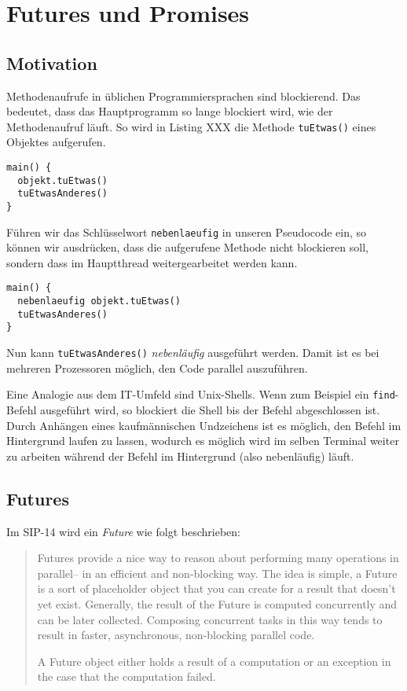 \section{Futures und Promises}

\subsection{Motivation}

Methodenaufrufe in üblichen Programmiersprachen sind blockierend. Das bedeutet,
dass das Hauptprogramm so lange blockiert wird, wie der Methodenaufruf läuft.
So wird in Listing XXX die Methode \texttt{tuEtwas()} eines Objektes aufgerufen.

\begin{lstlisting}
main() {
  objekt.tuEtwas()
  tuEtwasAnderes()
}
\end{lstlisting}

Führen wir das Schlüsselwort \texttt{nebenlaeufig} in unseren Pseudocode ein,
so können wir ausdrücken, dass die aufgerufene Methode nicht blockieren soll,
sondern dass im Hauptthread weitergearbeitet werden kann.

\begin{lstlisting}
main() {
  nebenlaeufig objekt.tuEtwas()
  tuEtwasAnderes()
}
\end{lstlisting}

Nun kann \texttt{tuEtwasAnderes()} \emph{nebenläufig} ausgeführt werden. Damit
ist es bei mehreren Prozessoren möglich, den Code parallel auszuführen.

Eine Analogie aus dem IT-Umfeld sind Unix-Shells. Wenn zum Beispiel ein
\texttt{find}-Befehl ausgeführt wird, so blockiert die Shell bis der Befehl
abgeschlossen ist. Durch Anhängen eines kaufmännischen Undzeichens ist es möglich,
den Befehl im Hintergrund laufen zu lassen, wodurch es möglich wird im selben
Terminal weiter zu arbeiten während der Befehl im Hintergrund (also nebenläufig)
läuft.

\subsection{Futures}

Im SIP-14 wird ein \emph{Future} wie folgt beschrieben:
\begin{quote}
Futures provide a nice way to reason about performing many operations in 
parallel– in an efficient and non-blocking way. The idea is simple, a Future 
is a sort of placeholder object that you can create for a result that doesn’t 
yet exist. Generally, the result of the Future is computed concurrently and can 
be later collected. Composing concurrent tasks in this way tends to result in 
faster, asynchronous, non-blocking parallel code.

A Future object either holds a result of a computation or an 
exception in the case that the computation failed.
\end{quote}

